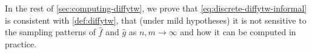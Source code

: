 In the rest of \cref{sec:computing-diffytw}, we prove that \cref{eq:discrete-diffytw-informal} is consistent with \cref{def:diffytw}, that (under mild hypotheses) it is not sensitive to the sampling patterns of $\hat f$ and $\hat g$ as $n, m\to\infty$ and how it can be computed in practice.







